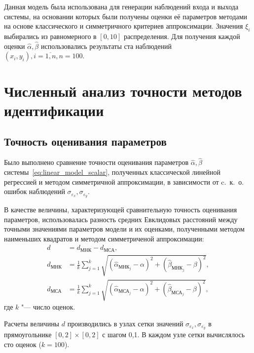 Данная модель была использована для генерации наблюдений входа и выхода системы,
на основании которых были получены оценки её параметров методами на основе
классического и симметричного критериев аппроксимации.
Значения \( \xi_i \) выбирались из равномерного в \( [0, 10] \) распределения.
Для получения каждой оценки \( \hat{\alpha}, \hat{\beta} \) использовались результаты
ста наблюдений \( ( x_i, y_i ), i = \overline{1, n}, n = 100 \).

\section{Численный анализ точности методов идентификации}

\subsection{Точность оценивания параметров}

Было выполнено сравнение точности оценивания параметров
\( \hat{\alpha}, \hat{\beta} \) системы~\eqref{eq:linear_model_scalar},
полученных классической линейной регрессией и методом симметричной аппроксимации,
в зависимости от c.~к.~о. ошибок наблюдений \( \sigma_{\varepsilon_x}, \sigma_{\varepsilon_y} \).

В качестве величины, характеризующей сравнительную точность оценивания параметров,
использовалась разность средних Евклидовых расстояний
между точными значениями параметров модели и их оценками,
полученными методом наименьших квадратов и методом симметриченой аппроксимации:
\begin{equation*}
  \begin{aligned}
    d &= d_{\text{МНК}} - d_{\text{МСА}}, \\
    d_{\text{МНК}} &= \frac{1}{k} \sum_{j=1}^k \sqrt{(\hat{\alpha}_{\text{МНК}_j} - \alpha)^2 + (\hat{\beta}_{\text{МНК}_j} - \beta)^2}, \\
    d_{\text{МСА}} &= \frac{1}{k} \sum_{j=1}^k \sqrt{(\hat{\alpha}_{\text{МСА}_j} - \alpha)^2 + (\hat{\beta}_{\text{МСА}_j} - \beta)^2},
  \end{aligned}
\end{equation*}
где \( k \) "--- число оценок.

Расчеты величины \( d \) производились в узлах сетки значений
\( \sigma_{\varepsilon_x}, \sigma_{\varepsilon_y} \) в прямоугольнике
\( [0, 2] \times [0, 2] \) с шагом 0{,}1.
В каждом узле сетки вычислялось сто оценок (\( k = 100 \)).

